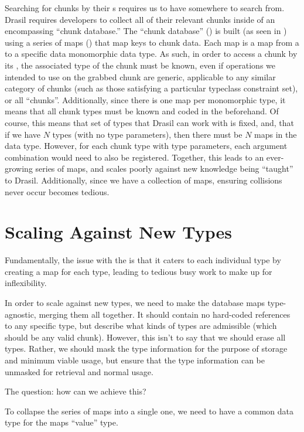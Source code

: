 Searching for chunks by their \UID{}s requires us to have somewhere to search
from. Drasil requires developers to collect all of their relevant chunks inside
of an encompassing ``chunk database.'' The ``chunk database'' (\ChunkDB{}) is
built (as seen in ) using a series of maps
() that map \UID{} keys to chunk data. Each
map is a map from a \UID{} to a specific data monomorphic data type. As such, in
order to access a chunk by its \UID{}, the associated type of the chunk must be
known, even if operations we intended to use on the grabbed chunk are generic,
applicable to any similar category of chunks (such as those satisfying a
particular typeclass constraint set), or all ``chunks''. Additionally, since
there is one map per monomorphic type, it means that all chunk types must be
known and coded in the \ChunkDB{} beforehand. Of course, this means that set of
types that Drasil can work with is fixed, and, that if we have \(N\) types (with
no type parameters), then there must be \(N\) maps in the \ChunkDB{} data type.
However, for each chunk type with type parameters, each argument combination
would need to also be registered. Together, this leads to an ever-growing series
of maps, and scales poorly against new knowledge being ``taught'' to Drasil.
Additionally, since we have a collection of maps, ensuring \UID{} collisions
never occur becomes tedious.

\section{Scaling Against New Types}

Fundamentally, the issue with the \ChunkDB{} is that it caters to each
individual type by creating a map for each type, leading to tedious busy work to
make up for inflexibility.

In order to scale against new types, we need to make the database maps
type-agnostic, merging them all together. It should contain no hard-coded
references to any specific type, but describe what kinds of types are admissible
(which should be any valid chunk). However, this isn't to say that we should
erase all types. Rather, we should mask the type information for the purpose of
storage and minimum viable usage, but ensure that the type information can be
unmasked for retrieval and normal usage.

The question: how can we achieve this?

To collapse the series of maps into a single one, we need to have a common data
type for the maps ``value'' type. 

